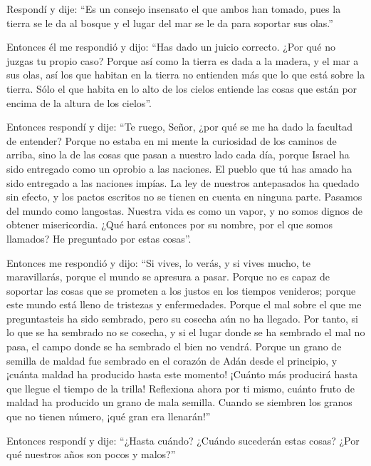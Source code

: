  Respondí y dije: ``Es un consejo insensato el que ambos
han tomado, pues la tierra se le da al bosque y el lugar del mar se le
da para soportar sus olas.''

 Entonces él me respondió y dijo: ``Has dado un juicio
correcto. ¿Por qué no juzgas tu propio caso?  Porque así
como la tierra es dada a la madera, y el mar a sus olas, así los que
habitan en la tierra no entienden más que lo que está sobre la tierra.
Sólo el que habita en lo alto de los cielos entiende las cosas que están
por encima de la altura de los cielos''.

 Entonces respondí y dije: ``Te ruego, Señor, ¿por qué se
me ha dado la facultad de entender?  Porque no estaba en
mi mente la curiosidad de los caminos de arriba, sino la de las cosas
que pasan a nuestro lado cada día, porque Israel ha sido entregado como
un oprobio a las naciones. El pueblo que tú has amado ha sido entregado
a las naciones impías. La ley de nuestros antepasados ha quedado sin
efecto, y los pactos escritos no se tienen en cuenta en ninguna parte.
 Pasamos del mundo como langostas. Nuestra vida es como
un vapor, y no somos dignos de obtener misericordia. 
¿Qué hará entonces por su nombre, por el que somos llamados? He
preguntado por estas cosas''.

 Entonces me respondió y dijo: ``Si vives, lo verás, y si
vives mucho, te maravillarás, porque el mundo se apresura a pasar.
 Porque no es capaz de soportar las cosas que se prometen
a los justos en los tiempos venideros; porque este mundo está lleno de
tristezas y enfermedades.  Porque el mal sobre el que me
preguntasteis ha sido sembrado, pero su cosecha aún no ha llegado.
 Por tanto, si lo que se ha sembrado no se cosecha, y si
el lugar donde se ha sembrado el mal no pasa, el campo donde se ha
sembrado el bien no vendrá.  Porque un grano de semilla
de maldad fue sembrado en el corazón de Adán desde el principio, y
¡cuánta maldad ha producido hasta este momento! ¡Cuánto más producirá
hasta que llegue el tiempo de la trilla!  Reflexiona
ahora por ti mismo, cuánto fruto de maldad ha producido un grano de mala
semilla.  Cuando se siembren los granos que no tienen
número, ¡qué gran era llenarán!''

 Entonces respondí y dije: ``¿Hasta cuándo? ¿Cuándo
sucederán estas cosas? ¿Por qué nuestros años son pocos y malos?''

